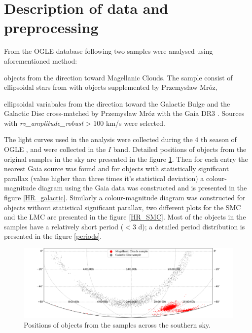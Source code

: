 \documentclass{pracalicmgr}
\newenvironment{itemize*}%
  {\vspace{-\topsep}
    \begin{itemize}%
    \setlength{\itemsep}{0pt}%
    \setlength{\parskip}{0pt}}%
  {\end{itemize}
  \vspace{-\topsep}}
\begin{document}
\section{Description of data and preprocessing}
From the OGLE \citep{udalski_optical_1992} database following two samples were analysed using aforementioned method:
\begin{itemize*}
    \item objects from the direction toward Magellanic Clouds. The sample consist of ellipsoidal stars from \citet{pawlak_ogle_2016} with objects supplemented 
    by Przemysław Mróz, 
    \item ellipsoidal variabales from the direction toward the Galactic Bulge and the Galactic Disc cross-matched by Przemysław Mróz with the Gaia DR3 
    \citep{gaia_collaboration_gaia_2022}. Sources with  {\it{rv\_amplitude\_robust}} > $100$ km/s were selected.
\end{itemize*}
The light curves used in the analysis were collected during the $4$ th season of OGLE \citet{udalski_ogle-iv_2015},
and were collected in the $I$ band.
Detailed positions of objects from the original samples in the sky are presented in the figure \ref{map}. Then for each entry the nearest Gaia source
was found and for objects with statistically significant parallax (value higher than three times it's statistical deviation) a colour-magnitude
diagram using the Gaia data was constructed and is presented in the figure \ref{HR_galactic}. Similarly a colour-magnitude diagram was constructed for
objects without statistical significant parallax, two different plots for the SMC and the LMC are presented in the figure \ref{HR_SMC}.
Most of the objects in the samples have a relatively short period ($<3$ d); a detailed period distribution
is presented in the figure \ref{periods}.
\begin{figure}
    \begin{center}
        \includegraphics[scale=0.52]{plots/map_sample.png}
    \end{center}
    \caption{Positions of objects from the samples across the southern sky.}
    \label{map}
\end{figure}
\end{document}
